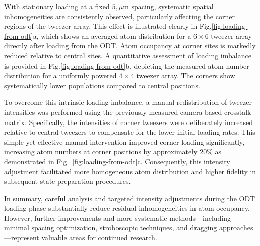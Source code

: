 With stationary loading at a fixed $5,\mu$m spacing, systematic spatial inhomogeneities are consistently observed, particularly affecting the corner regions of the tweezer array. This effect is illustrated clearly in Fig.\ref{fig:loading-from-odt}a, which shows an averaged atom distribution for a $6\times6$ tweezer array directly after loading from the ODT. Atom occupancy at corner sites is markedly reduced relative to central sites. A quantitative assessment of loading imbalance is provided in Fig.\ref{fig:loading-from-odt}b, depicting the measured atom number distribution for a uniformly powered $4\times4$ tweezer array. The corners show systematically lower populations compared to central positions.

To overcome this intrinsic loading imbalance, a manual redistribution of tweezer intensities was performed using the previously measured camera-based crosstalk matrix. Specifically, the intensities of corner tweezers were deliberately increased relative to central tweezers to compensate for the lower initial loading rates. This simple yet effective manual intervention improved corner loading significantly, increasing atom numbers at corner positions by approximately 20\% as demonstrated in Fig.~\ref{fig:loading-from-odt}c. Consequently, this intensity adjustment facilitated more homogeneous atom distribution and higher fidelity in subsequent state preparation procedures.

In summary, careful analysis and targeted intensity adjustments during the ODT loading phase substantially reduce residual inhomogeneities in atom occupancy. However, further improvements and more systematic methods—including minimal spacing optimization, stroboscopic techniques, and dragging approaches—represent valuable areas for continued research.


